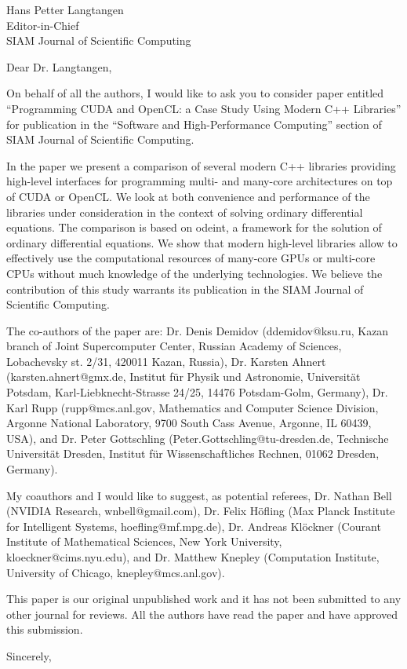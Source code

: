 \documentclass[a4paper,11pt]{letter}
\begin{document}
\begin{letter}{
    Hans Petter Langtangen\\
    Editor-in-Chief\\
    SIAM Journal of Scientific Computing
    }
\opening{Dear Dr. Langtangen,}

On behalf of all the authors, I would like to ask you to consider paper
entitled ``Programming CUDA and OpenCL: a Case Study Using Modern C++
Libraries'' for publication in the ``Software and High-Performance Computing''
section of SIAM Journal of Scientific Computing.

In the paper we present a comparison of several modern C++ libraries providing
high-level interfaces for programming multi- and many-core architectures on top
of CUDA or OpenCL.  We look at both convenience and performance of the
libraries under consideration in the context of solving ordinary differential
equations. The comparison is based on odeint, a framework for the solution of
ordinary differential equations. We show that modern high-level libraries allow
to effectively use the computational resources of many-core GPUs or multi-core
CPUs without much knowledge of the underlying technologies. We believe the
contribution of this study warrants its publication in the SIAM Journal of
Scientific Computing.

The co-authors of the paper are: Dr. Denis Demidov (ddemidov@ksu.ru, Kazan
branch of Joint Supercomputer Center, Russian Academy of Sciences, Lobachevsky
st. 2/31, 420011 Kazan, Russia), Dr. Karsten Ahnert (karsten.ahnert@gmx.de,
Institut f\"ur Physik und Astronomie, Universit\"at Potsdam,
Karl-Liebknecht-Strasse 24/25, 14476 Potsdam-Golm, Germany), Dr. Karl Rupp
(rupp@mcs.anl.gov, Mathematics and Computer Science Division, Argonne National
Laboratory, 9700 South Cass Avenue, Argonne, IL 60439, USA), and Dr. Peter
Gottschling (Peter.Gottschling@tu-dresden.de, Technische Universit\"at Dresden,
Institut f\"ur Wissenschaftliches Rechnen, 01062 Dresden, Germany).

My coauthors and I would like to suggest, as potential referees, Dr. Nathan
Bell (NVIDIA Research, wnbell@gmail.com), Dr. Felix H\"ofling (Max Planck
Institute for Intelligent Systems, hoefling@mf.mpg.de), Dr. Andreas Kl\"ockner
(Courant Institute of Mathematical Sciences, New York University,
kloeckner@cims.nyu.edu), and Dr. Matthew Knepley (Computation Institute,
University of Chicago, knepley@mcs.anl.gov).

This paper is our original unpublished work and it has not been submitted to
any other journal for reviews. All the authors have read the paper and have
approved this submission.

\closing{Sincerely,}

\end{letter}
\end{document}

